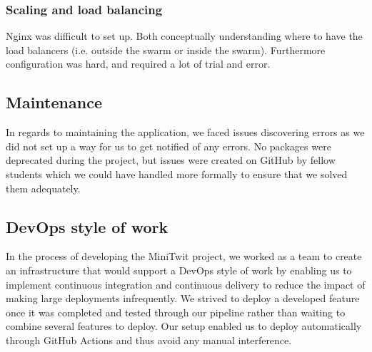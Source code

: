 \subsubsection{Scaling and load balancing}
Nginx was difficult to set up. Both conceptually understanding where to have the load balancers (i.e. outside the swarm or inside the swarm).
Furthermore configuration was hard, and required a lot of trial and error.\\


\subsection{Maintenance}
In regards to maintaining the application, we faced issues discovering errors as we did not set up a way for us to get
notified of any errors. No packages were deprecated during the project, but issues were created on GitHub by 
fellow students which we could have handled more formally to ensure that we solved them adequately.

\subsection{DevOps style of work}
In the process of developing the MiniTwit project, we worked as a team to create an infrastructure that would support a DevOps style of work by enabling us 
to implement continuous integration and continuous delivery to reduce the impact of making large deployments infrequently. We strived to deploy a developed 
feature once it was completed and tested through our pipeline rather than waiting to combine several features to deploy. Our setup enabled us to deploy automatically
through GitHub Actions and thus avoid any manual interference.